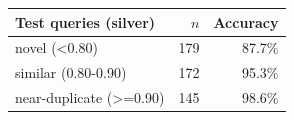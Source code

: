 \begin{tabular}{lrr}
\toprule
Test queries (silver) & $n$ & Accuracy \\
\midrule
novel (<0.80) & 179 & 87.7\% \\
similar (0.80-0.90) & 172 & 95.3\% \\
near-duplicate (>=0.90) & 145 & 98.6\% \\
\bottomrule
\end{tabular}